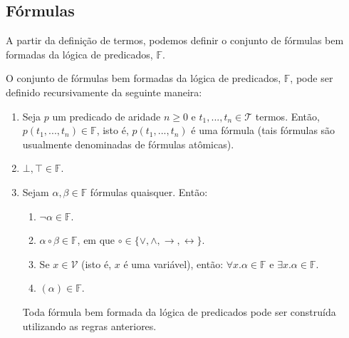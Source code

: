 \subsection{Fórmulas}

A partir da definição de termos, podemos definir o conjunto de
fórmulas bem formadas da lógica de predicados,
$\mathbb{F}$.

\begin{Definition}\label{predsyntaxdef}
O conjunto de fórmulas bem formadas da lógica de predicados,
$\mathbb{F}$, pode ser definido recursivamente da seguinte maneira:
\begin{enumerate}
  \item Seja $p$ um predicado de aridade $n \geq 0$ e
    $t_1,...,t_n\in\mathcal{T}$ termos. Então,
    $p(t_1,...,t_n)\in\mathbb{F}$, isto é, $p(t_1,...,t_n)$ é uma
    fórmula (tais fórmulas são usualmente denominadas de fórmulas atômicas).
  \item $\bot,\top \in \mathbb{F}$.
  \item Sejam $\alpha, \beta \in \mathbb{F}$ fórmulas
    quaisquer. Então:
    \begin{enumerate}
      \item $\neg \alpha \in \mathbb{F}$.
      \item $\alpha \circ \beta \in \mathbb{F}$, em que
        $\circ\in\{\lor,\land,\to,\leftrightarrow\}$.
      \item Se $x \in \mathcal{V}$ (isto é, $x$ é uma variável),
        então: $\forall x. \alpha \in \mathbb{F}$ e $\exists x. \alpha
        \in \mathbb{F}$.
      \item $(\alpha)\in\mathbb{F}$.
    \end{enumerate}
    Toda fórmula bem formada da lógica de predicados pode ser
    construída utilizando as regras anteriores.
\end{enumerate}
\end{Definition}

